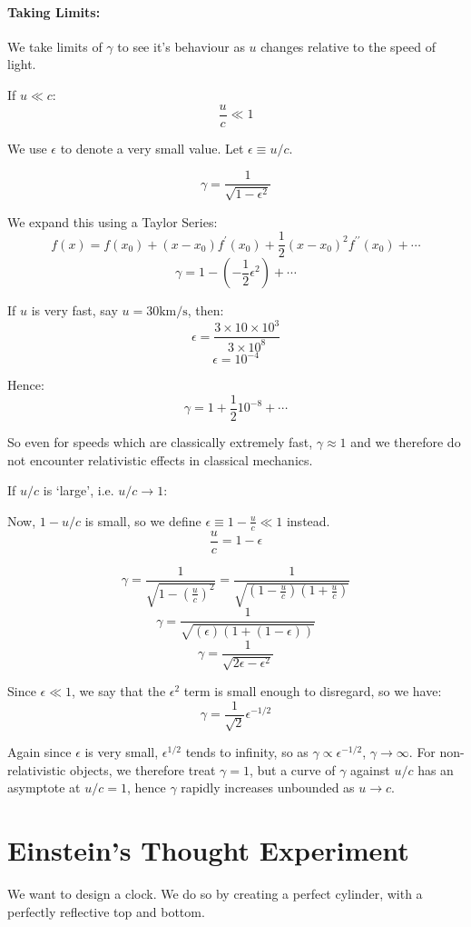 \paragraph{Taking Limits:} We take limits of $\gamma$ to see it's behaviour as $u$ changes relative to the speed of light.

If $u \ll c$:
\[
    \frac{u}{c} \ll 1
\]

We use $\epsilon$ to denote a very small value. Let $\epsilon \equiv u/c$.

\[
    \gamma = \frac{1}{\sqrt{1 - \epsilon^2}}
\]

We expand this using a Taylor Series:
\[
    f(x) = f(x_0) + (x-x_0) f^\prime(x_0) + \frac{1}{2} (x-x_0)^2 f^{\prime\prime}(x_0) + \cdots
\]
\[
    \gamma = 1 - (- \frac{1}{2} \epsilon^2) + \cdots
\]

If $u$ is very fast, say $u = 30 \text{km/s}$, then:
\[
    \epsilon = \frac{3 \times 10 \times 10^3}{3 \times 10^{8}}
\]
\[
    \epsilon = 10^{-4}
\]

Hence:
\[
    \gamma = 1 + \frac{1}{2} 10^{-8} + \cdots
\]

So even for speeds which are classically extremely fast, $\gamma \approx 1$ and we therefore do not encounter relativistic effects in classical mechanics.

If $u / c$ is `large', i.e. $u/c \to 1$:

Now, $1 - u/c$ is small, so we define $\epsilon \equiv 1 - \frac{u}{c} \ll 1$ instead.
\[
    \frac{u}{c} = 1 - \epsilon
\]

\[
    \gamma = \frac{1}{\sqrt{1 - \left(\frac{u}{c}\right)^2}} = \frac{1}{\sqrt{\left(1 - \frac{u}{c}\right)\left(1 + \frac{u}{c}\right)}}
\]
\[
    \gamma = \frac{1}{\sqrt{\left(\epsilon\right)\left(1 + (1 - \epsilon)\right)}}
\]
\[
    \gamma = \frac{1}{\sqrt{2 \epsilon - \epsilon^2}}
\]

Since $\epsilon \ll 1$, we say that the $\epsilon^2$ term is small enough to disregard, so we have:
\[
    \gamma = \frac{1}{\sqrt{2}} \epsilon^{-1/2}
\]

Again since $\epsilon$ is very small, $\epsilon^{1/2}$ tends to infinity, so as $\gamma \propto \epsilon^{-1/2}$, $\gamma \to \infty$. For non-relativistic objects, we therefore treat $\gamma = 1$, but a curve of $\gamma$ against $u/c$ has an asymptote at $u/c = 1$, hence $\gamma$ rapidly increases unbounded as $u \to c$.

\section{Einstein's Thought Experiment}
We want to design a clock. We do so by creating a perfect cylinder, with a perfectly reflective top and bottom. 

